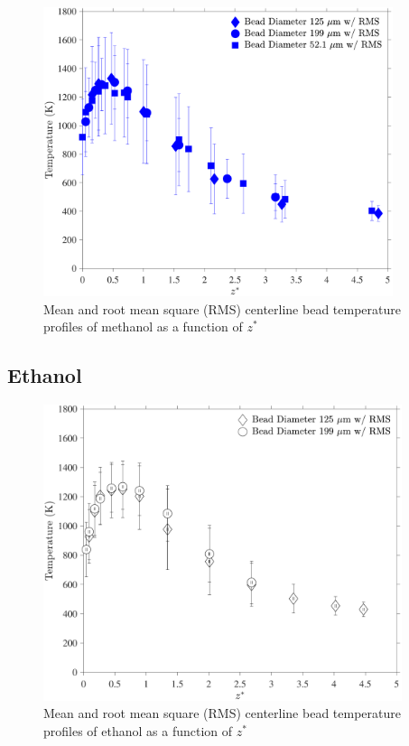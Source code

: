 \documentclass[12pt]{article}
\begin{document}
\begin{figure}[!h]
	\centering
\includegraphics[width=10.25cm,keepaspectratio]{Methanol_Bead_Temperature.pdf}
	\caption[Mean and RMS centerline bead temperature profile of nethanol]{Mean and root mean square (RMS) centerline bead temperature profiles of methanol as a function of $z^*$}
	\label{fig:Methanol_Bead_Temp}
\end{figure}

\pagebreak

\subsection{Ethanol}
\label{ssec:Ethanol_Bead_Temp}
\begin{figure}[h!]
	\centering
\includegraphics[width=10.5cm,keepaspectratio]{Ethanol_Bead_Temperature.pdf}
	\caption[Mean and RMS centerline bead temperature profile of ethanol]{Mean and root mean square (RMS) centerline bead temperature profiles of ethanol as a function of $z^*$}
	\label{fig:Ethanol_Bead_Temp}
\end{figure}
\end{document}
